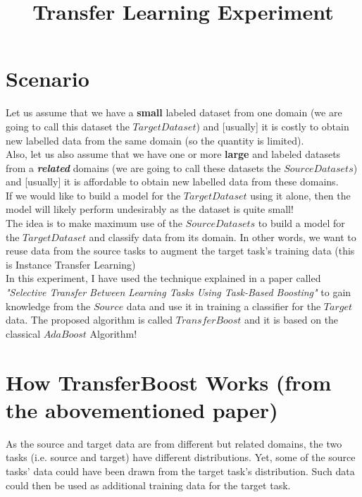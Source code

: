 \documentclass[a4paper,12pt, english]{article}
\begin{document}
\title{Transfer Learning Experiment}

\section{Scenario}
Let us assume that we have a \textbf{small} labeled dataset from one domain (we are going to call this dataset the $Target Dataset$) and [usually] it is costly to obtain new labelled data from the same domain (so the quantity is limited). \\

Also, let us also assume that we have one or more \textbf{large} and labeled datasets from a \textbf{\emph{related}} domains (we are going to call these datasets the $Source Datasets$) and [usually] it is affordable to obtain new labelled data from these domains.\\


If we would like to build a model for the $Target Dataset$ using it alone, then the model will likely perform undesirably as the dataset is quite small!\\

The idea is to make maximum use of the $Source Datasets$  to build a model for the $Target Dataset$ and classify data from its domain. In other words, we want to reuse data from the source tasks to augment the target task's training data (this is Instance Transfer Learning)\\

In this experiment, I have used the technique explained in a paper called \textit{"Selective Transfer Between Learning Tasks Using Task-Based Boosting"} to gain knowledge from the $Source$ data and use it in training a classifier for the $Target$ data. The proposed algorithm is called $TransferBoost$ and it is based on the classical $AdaBoost$ Algorithm!\\

\section{How TransferBoost Works (from the abovementioned paper)}
As the source and target data are from different but related domains, the two tasks (i.e. source and target) have different distributions. Yet, some of the source tasks' data could have been drawn from the target task's distribution. Such data could then be used as additional training data for the target task.\\
\end{document}
